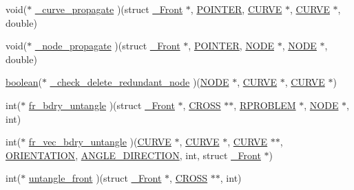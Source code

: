 \begin{DoxyCompactItemize}
\item 
void($\ast$ \hyperlink{struct___front_a88dc9bb33f291b0166d003ca92570c93}{\+\_\+curve\+\_\+propagate} )(struct \hyperlink{struct___front}{\+\_\+\+Front} $\ast$, \hyperlink{cdecs_8h_ae51a81000f343b8ec43bca1f6a723d7b}{P\+O\+I\+N\+T\+ER}, \hyperlink{int_8h_a4c1c272bef898dbaa20b055af85cd685}{C\+U\+R\+VE} $\ast$, \hyperlink{int_8h_a4c1c272bef898dbaa20b055af85cd685}{C\+U\+R\+VE} $\ast$, double)
\item 
void($\ast$ \hyperlink{struct___front_a73ec8b453a666190a2325bba789dfebb}{\+\_\+node\+\_\+propagate} )(struct \hyperlink{struct___front}{\+\_\+\+Front} $\ast$, \hyperlink{cdecs_8h_ae51a81000f343b8ec43bca1f6a723d7b}{P\+O\+I\+N\+T\+ER}, \hyperlink{int_8h_a65acc517559b106aa8e5fe339247ddcd}{N\+O\+DE} $\ast$, \hyperlink{int_8h_a65acc517559b106aa8e5fe339247ddcd}{N\+O\+DE} $\ast$, double)
\item 
\hyperlink{cdecs_8h_ad048433382a936258fb49e2ec4f148e1}{boolean}($\ast$ \hyperlink{struct___front_a2409af18036fdd0941ed5f9114370566}{\+\_\+check\+\_\+delete\+\_\+redundant\+\_\+node} )(\hyperlink{int_8h_a65acc517559b106aa8e5fe339247ddcd}{N\+O\+DE} $\ast$, \hyperlink{int_8h_a4c1c272bef898dbaa20b055af85cd685}{C\+U\+R\+VE} $\ast$, \hyperlink{int_8h_a4c1c272bef898dbaa20b055af85cd685}{C\+U\+R\+VE} $\ast$)
\item 
int($\ast$ \hyperlink{struct___front_a17401a50785c81c9f921e98bedf011ca}{fr\+\_\+bdry\+\_\+untangle} )(struct \hyperlink{struct___front}{\+\_\+\+Front} $\ast$, \hyperlink{int_8h_ade0b8470b483dfba2e7378f5dad9eebd}{C\+R\+O\+SS} $\ast$$\ast$, \hyperlink{frp_8h_a8e39ec4bf8bcc03a2e164b2ab39b9b33}{R\+P\+R\+O\+B\+L\+EM} $\ast$, \hyperlink{int_8h_a65acc517559b106aa8e5fe339247ddcd}{N\+O\+DE} $\ast$, int)
\item 
int($\ast$ \hyperlink{struct___front_a1ebe129331a592855607b770111e079a}{fr\+\_\+vec\+\_\+bdry\+\_\+untangle} )(\hyperlink{int_8h_a4c1c272bef898dbaa20b055af85cd685}{C\+U\+R\+VE} $\ast$, \hyperlink{int_8h_a4c1c272bef898dbaa20b055af85cd685}{C\+U\+R\+VE} $\ast$, \hyperlink{int_8h_a4c1c272bef898dbaa20b055af85cd685}{C\+U\+R\+VE} $\ast$$\ast$, \hyperlink{geom_8h_adc460053ab2088d3fe74b8b90a7a1c4c}{O\+R\+I\+E\+N\+T\+A\+T\+I\+ON}, \hyperlink{geom_8h_a13077ae8532df1d89c9dd91d5def48cb}{A\+N\+G\+L\+E\+\_\+\+D\+I\+R\+E\+C\+T\+I\+ON}, int, struct \hyperlink{struct___front}{\+\_\+\+Front} $\ast$)
\item 
int($\ast$ \hyperlink{struct___front_ae1088686d23126bfd2e8292690c0bd1d}{untangle\+\_\+front} )(struct \hyperlink{struct___front}{\+\_\+\+Front} $\ast$, \hyperlink{int_8h_ade0b8470b483dfba2e7378f5dad9eebd}{C\+R\+O\+SS} $\ast$$\ast$, int)
$$
\end{DoxyCompactItemize}
